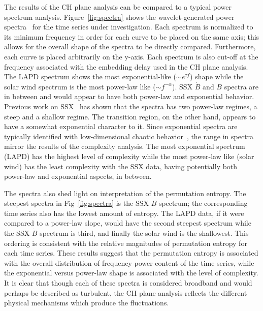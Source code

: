 \documentclass[aps,prx,twocolumn,secnumarabic,nobalancelastpage,amsmath,amssymb,
nofootinbib]{revtex4-1}
\begin{document}
The results of the CH plane analysis can be compared to a typical power spectrum analysis. Figure~\ref{fig:spectra} shows the wavelet-generated power spectra~\cite{torrence1998} for the time series under investigation. Each spectrum is normalized to its minimum frequency in order for each curve to be placed on the same axis; this allows for the overall shape of the spectra to be directly compared. Furthermore, each curve is placed arbitrarily on the y-axis. Each spectrum is also cut-off at the frequency associated with the embedding delay used in the CH plane analysis. The LAPD spectrum shows the most exponential-like ($\sim e^{\tau f}$) shape while the solar wind spectrum is the most power-law like ($\sim f^{-\alpha}$). SSX $\dot{B}$ and $B$ spectra are in between and would appear to have both power-law and exponential behavior. Previous work on SSX~\cite{schaffner2014c} has shown that the spectra has two power-law regimes, a steep and a shallow regime. The transition region, on the other hand, appears to have a somewhat exponential character to it. Since exponential spectra are typically identified with low-dimensional chaotic behavior~\cite{maggs2012}, the range in spectra mirror the results of the complexity analysis. The most exponential spectrum (LAPD) has the highest level of complexity while the most power-law like (solar wind) has the least complexity with the SSX data, having potentially both power-law and exponential aspects, in between. 

The spectra also shed light on interpretation of the permutation entropy. The steepest spectra in Fig~\ref{fig:spectra} is the SSX $B$ spectrum; the corresponding time series also has the lowest amount of entropy. The LAPD data, if it were compared to a power-law slope, would have the second steepest spectrum while the SSX $\dot{B}$ spectrum is third, and finally the solar wind is the shallowest. This ordering is consistent with the relative magnitudes of permutation entropy for each time series. These results suggest that the permutation entropy is associated with the overall distribution of frequency power content of the time series, while the exponential versus power-law shape is associated with the level of complexity. It is clear that though each of these spectra is considered broadband and would perhaps be described as turbulent, the CH plane analysis reflects the different physical mechanisms which produce the fluctuations.
\end{document}
